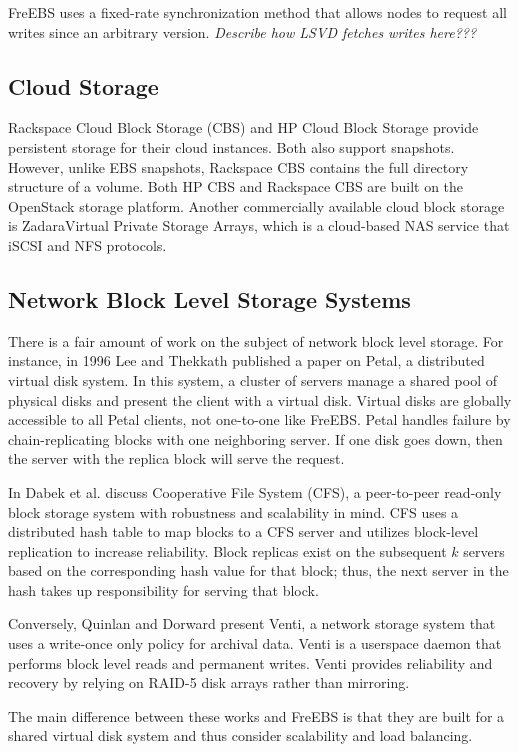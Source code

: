 FreEBS uses a fixed-rate synchronization method that allows nodes to request 
all writes since an arbitrary version. \emph{Describe how LSVD fetches 
writes here???}


\subsection{Cloud Storage}
Rackspace Cloud Block Storage (CBS) and HP Cloud Block Storage provide 
persistent storage for their cloud instances\cite{rackspace, hp}. Both also 
support snapshots. However, unlike EBS snapshots, Rackspace CBS contains the 
full directory structure of a volume. Both HP CBS and Rackspace CBS are 
built on the OpenStack storage platform. Another commercially available 
cloud block storage is Zadara\texttrademark Virtual Private Storage 
Arrays\cite{zadara}, which is a cloud-based NAS service that iSCSI and NFS 
protocols.  

\subsection{Network Block Level Storage Systems}
There is a fair amount of work on the subject of network block level storage.
For instance, in 1996 Lee and Thekkath published a paper on Petal, a 
distributed virtual disk system\cite{lee1996petal}. In this system, a cluster
of servers manage a shared pool of physical disks and present the client 
with a virtual disk. Virtual disks are globally accessible to all
Petal clients, not one-to-one like FreEBS. Petal handles failure by 
chain-replicating blocks with one neighboring server. If one disk goes down,
then the server with the replica block will serve the request. 

In \cite{dabek2001wide} Dabek et al. discuss Cooperative File System (CFS), 
a peer-to-peer read-only block storage system with robustness and 
scalability in mind. CFS uses a distributed hash table to map blocks to a CFS
server and utilizes block-level replication to increase reliability. 
Block replicas exist on the subsequent $k$ servers based on the corresponding
hash value for that block; thus, the next server in the hash takes up 
responsibility for serving that block.  

Conversely, Quinlan and Dorward present Venti, a network storage system that
uses a write-once only policy for archival data\cite{quinlan2002venti}. Venti
is a userspace daemon that performs block level reads and permanent writes. 
Venti provides reliability and recovery by relying on RAID-5 disk arrays 
rather than mirroring.  

The main difference between these works and FreEBS is that they are built 
for a shared virtual disk system and thus consider scalability and load
balancing.

